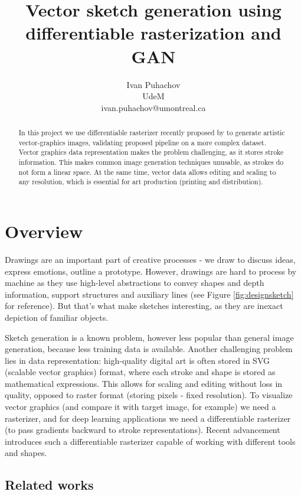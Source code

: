\documentclass{article}
\title{Vector sketch generation using differentiable rasterization and GAN}
\author{
   Ivan Puhachov \\ 
   UdeM \\
   ivan.puhachov@umontreal.ca \\
}
\begin{document}
\maketitle

\begin{abstract}
  In this project we use differentiable rasterizer recently proposed by \cite{diffsvg} to generate artistic vector-graphics images, validating proposed pipeline on a more complex dataset. Vector graphics data representation makes the problem challenging, as it stores stroke information. This makes common image generation techniques unusable, as strokes do not form a linear space. At the same time, vector data allows editing and scaling to any resolution, which is essential for art production (printing and distribution).
\end{abstract}

\section{Overview}
Drawings are an important part of creative processes - we draw to discuss ideas, express emotions, outline a prototype. However, drawings are hard to process by machine as they use high-level abstractions to convey shapes and depth information, support structures and auxiliary lines (see Figure \ref{fig:designsketch} for reference). But that's what make sketches interesting, as they are inexact depiction of familiar objects.

Sketch generation is a known problem, however less popular than general image generation, because less training data is available. Another challenging problem lies in data representation: high-quality digital art is often stored in SVG (scalable vector graphics) format, where each stroke and shape is stored as mathematical expressions. This allows for scaling and editing without loss in quality, opposed to raster format (storing pixels - fixed resolution). To visualize vector graphics (and compare it with target image, for example) we need a rasterizer, and for deep learning applications we need a differentiable rasterizer (to pass gradients backward to stroke representations). Recent advancement  \cite{diffsvg} introduces such a differentiable rasterizer capable of working with different tools and shapes.

\subsection{Related works}
\end{document}
